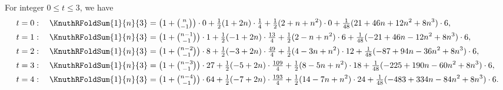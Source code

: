 \begin{example}
  For integer $0 \le t \le 3$, we have
  \begin{align*}
    t=0:\quad \KnuthRFoldSum{1}{n}{3}
    &=
    \bigl(1+\tbinom{n}{-1}\bigr)\cdot0
    +\tfrac{1}{2}(1+2n)\cdot\tfrac{1}{4}
    +\tfrac{1}{2}(2+n+n^2)\cdot0
    +\tfrac{1}{48}(21+46n+12n^2+8n^3)\cdot6,
    \\
    t=1:\quad \KnuthRFoldSum{1}{n}{3}
    &=
    \bigl(1+\tbinom{n-1}{-1}\bigr)\cdot1
    +\tfrac{1}{2}(-1+2n)\cdot\tfrac{13}{4}
    +\tfrac{1}{2}(2-n+n^2)\cdot6
    +\tfrac{1}{48}(-21+46n-12n^2+8n^3)\cdot6,
    \\
    t=2:\quad \KnuthRFoldSum{1}{n}{3}
    &=
    \bigl(1+\tbinom{n-2}{-1}\bigr)\cdot8
    +\tfrac{1}{2}(-3+2n)\cdot\tfrac{49}{4}
    +\tfrac{1}{2}(4-3n+n^2)\cdot12
    +\tfrac{1}{48}(-87+94n-36n^2+8n^3)\cdot6,
    \\
    t=3:\quad \KnuthRFoldSum{1}{n}{3}
    &=
    \bigl(1+\tbinom{n-3}{-1}\bigr)\cdot27
    +\tfrac{1}{2}(-5+2n)\cdot\tfrac{109}{4}
    +\tfrac{1}{2}(8-5n+n^2)\cdot18
    +\tfrac{1}{48}(-225+190n-60n^2+8n^3)\cdot6,
    \\
    t=4:\quad \KnuthRFoldSum{1}{n}{3}
    &=
    \bigl(1+\tbinom{n-4}{-1}\bigr)\cdot64
    +\tfrac{1}{2}(-7+2n)\cdot\tfrac{193}{4}
    +\tfrac{1}{2}(14-7n+n^2)\cdot24
    +\tfrac{1}{48}(-483+334n-84n^2+8n^3)\cdot6.
  \end{align*}
\end{example}
